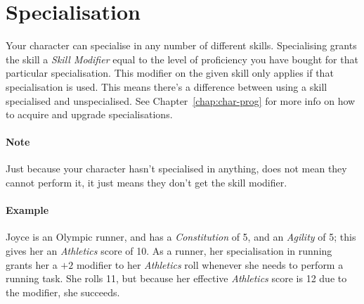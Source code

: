 \section{Specialisation}\label{sec:specialisation}
Your character can specialise in any number of different skills.
Specialising grants the skill a \textit{Skill Modifier} equal to the level of proficiency you have bought for that particular specialisation.
This modifier on the given skill only applies if that specialisation is used.
This means there's a difference between using a skill specialised and unspecialised.
See Chapter~\ref{chap:char-prog} for more info on how to acquire and upgrade specialisations.

\paragraph{Note} Just because your character hasn't specialised in anything, does not mean they cannot perform it, it just means they don't get the skill modifier.

\paragraph{Example} Joyce is an Olympic runner, and has a \textit{Constitution} of 5, and an \textit{Agility} of 5; this gives her an \textit{Athletics} score of 10. 
As a runner, her specialisation in running grants her a $+2$ modifier to her \textit{Athletics} roll whenever she needs to perform a running task.
She rolls 11, but because her effective \textit{Athletics} score is 12 due to the modifier, she succeeds.